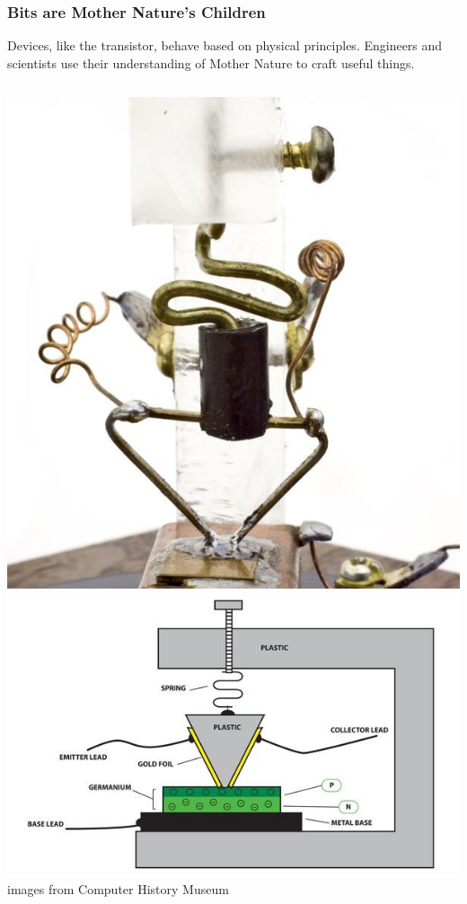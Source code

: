 \documentclass[handout]{beamer}
\begin{document}
\begin{frame}
  \frametitle{Bits are Mother Nature's Children}
  Devices, like the transistor, behave based on physical principles.
  Engineers and scientists use their understanding of Mother Nature to
  craft useful things.
  
  \begin{columns}
    \includegraphics[width=0.75\linewidth]{Graphics/CHM-Transistor-picture.jpg}
    \includegraphics[width=0.95\linewidth]{Graphics/CHM-Transistor-diagram-physics.jpg}
    images from Computer History Museum~\cite{CHM-Transistor-article}
  \end{columns}

\end{frame}
\end{document}

